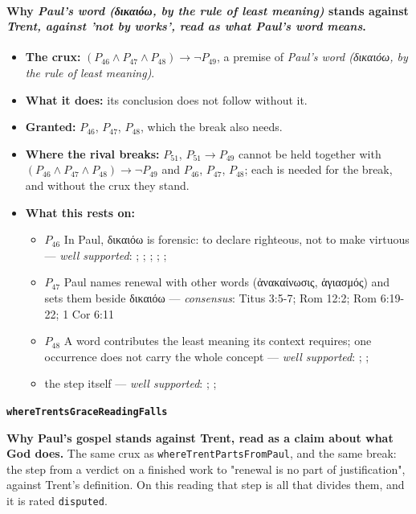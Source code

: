 \documentclass[11pt]{article}
\begin{document}
\paragraph{Why \emph{Paul's word (δικαιόω, by the rule of least meaning)} stands against \emph{Trent, against 'not by works', read as what Paul's word means}.}
\begin{itemize}
\item \textbf{The crux:} \((P_{46} \land P_{47} \land P_{48}) \rightarrow \lnot P_{49}\), a premise of \emph{Paul's word (δικαιόω, by the rule of least meaning)}.
\item \textbf{What it does:} its conclusion does not follow without it.
\item \textbf{Granted:} \(P_{46}\), \(P_{47}\), \(P_{48}\), which the break also needs.
\item \textbf{Where the rival breaks:} \(P_{51}\), \(P_{51} \rightarrow P_{49}\) cannot be held together with \((P_{46} \land P_{47} \land P_{48}) \rightarrow \lnot P_{49}\) and \(P_{46}\), \(P_{47}\), \(P_{48}\); each is needed for the break, and without the crux they stand.
\item \textbf{What this rests on:}
\begin{itemize}
\item \(P_{46}\) In Paul, δικαιόω is forensic: to declare righteous, not to make virtuous --- \emph{well supported}: \cite[s.v. δικαιόω]{bauer-danker-lexicon-2000}; \cite{morris-apostolic-preaching-1965}; \cite[p. 80]{moo-romans-1996}; \cite{irons-righteousness-of-god-2015}; \cite{wright-justification-2009}; \cite[ad loc. Rom 3:24]{fitzmyer-romans-1993}
\item \(P_{47}\) Paul names renewal with other words (ἀνακαίνωσις, ἁγιασμός) and sets them beside δικαιόω --- \emph{consensus}: Titus 3:5-7; Rom 12:2; Rom 6:19-22; 1 Cor 6:11
\item \(P_{48}\) A word contributes the least meaning its context requires; one occurrence does not carry the whole concept --- \emph{well supported}: \cite{silva-biblical-words-1994}; \cite{joos-semantic-axiom-1972}; \cite{barr-semantics-2004}
\item the step itself --- \emph{well supported}: \cite{silva-biblical-words-1994}; \cite[p. 80]{moo-romans-1996}; \cite{barr-semantics-2004}
\end{itemize}
\end{itemize}
\par\medskip\noindent\textbf{\texttt{where\allowbreak{}Trents\allowbreak{}Grace\allowbreak{}Reading\allowbreak{}Falls}}\par\nobreak\noindent
\textbf{Why Paul's gospel stands against Trent, read as a claim about what God does.} The same crux as \texttt{where\allowbreak{}Trent\allowbreak{}Parts\allowbreak{}From\allowbreak{}Paul}, and the same break: the step from a verdict on a finished work to "renewal is no part of justification", against Trent's definition. On this reading that step is all that divides them, and it is rated \texttt{disputed}.
\end{document}
